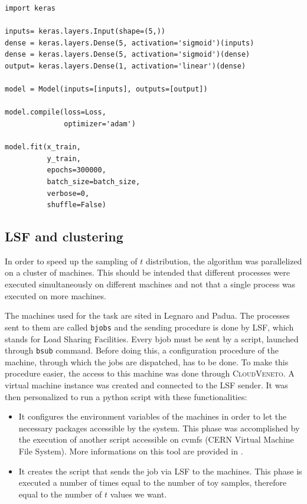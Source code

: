 \begin{lstlisting}[frame=single]
import keras

inputs= keras.layers.Input(shape=(5,))
dense = keras.layers.Dense(5, activation='sigmoid')(inputs)
dense = keras.layers.Dense(5, activation='sigmoid')(dense)
output= keras.layers.Dense(1, activation='linear')(dense)

model = Model(inputs=[inputs], outputs=[output])

model.compile(loss=Loss,
              optimizer='adam')

model.fit(x_train, 
          y_train,
          epochs=300000,
          batch_size=batch_size,
          verbose=0,
          shuffle=False)
\end{lstlisting}



\subsection{LSF and clustering}
In order to speed up the sampling of $t$ distribution, the algorithm was parallelized on a cluster of machines. This should be intended that different processes were executed simultaneously on different machines and not that a single process was executed on more machines.

The machines used for the task are sited in Legnaro and Padua. The processes sent to them are called \texttt{bjobs} and the sending procedure is done by LSF, which stands for Load Sharing Facilities. Every bjob must be sent by a script, launched through \texttt{bsub} command. Before doing this, a configuration procedure of the machine, through which the jobs are dispatched, has to be done. To make this procedure easier, the access to this machine was done through \textsc{CloudVeneto}. A virtual machine instance was created and connected to the LSF sender. It was then personalized to run a python script with these functionalities:
\begin{itemize}
	\item It configures the environment variables of the machines in order to let the necessary packages accessible by the system. This phase was accomplished by the execution of another script accessible on cvmfs (CERN Virtual Machine File System). More informations on this tool are provided in \cite{cvmfs}.
	\item It creates the script that sends the job via LSF to the machines. This phase is executed a number of times equal to the number of toy samples, therefore equal to the number of $t$ values we want.
\end{itemize}

